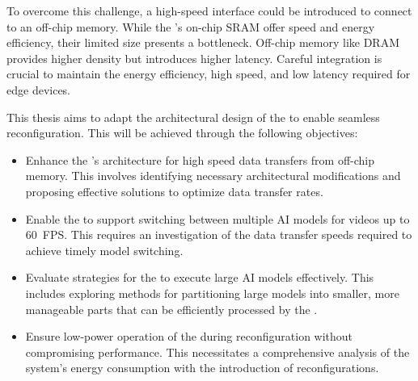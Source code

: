 
To overcome this challenge, a high-speed interface could be introduced to connect to an off-chip memory.
While the \graicore{}'s on-chip SRAM offer speed and energy efficiency, their limited size presents a bottleneck.
Off-chip memory like DRAM provides higher density but introduces higher latency.
Careful integration is crucial to maintain the energy efficiency, high speed, and low latency required for edge devices.

This thesis aims to adapt the architectural design of the \graicore{} to enable seamless reconfiguration.
This will be achieved through the following objectives:
\begin{itemize}
    \item
    Enhance the \graicore{}'s architecture for high speed data transfers from off-chip memory.
    This involves identifying necessary architectural modifications and proposing effective solutions to optimize data transfer rates.
    \item
    Enable the \graicore{} to support switching between multiple AI models for videos up to \SI{60}{FPS}.
    This requires an investigation of the data transfer speeds required to achieve timely model switching.
    \item
    Evaluate strategies for the \graicore{} to execute large AI models effectively.
    This includes exploring methods for partitioning large models into smaller, more manageable parts that can be efficiently processed by the \graicore{}.
    \item
    Ensure low-power operation of the \graicore{} during reconfiguration without compromising performance.
    This necessitates a comprehensive analysis of the system's energy consumption with the introduction of reconfigurations.
\end{itemize}